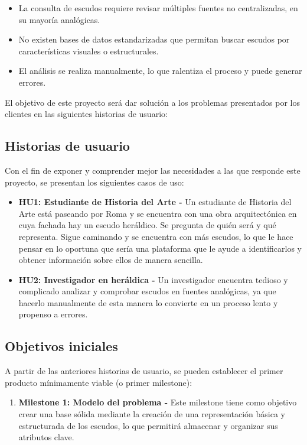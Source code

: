 \begin{itemize}
    \item La consulta de escudos requiere revisar múltiples fuentes no centralizadas, 
    en su mayoría analógicas.
    \item No existen bases de datos estandarizadas que permitan buscar escudos por
    características visuales o estructurales.
    \item El análisis se realiza manualmente, lo que ralentiza el proceso y puede
    generar errores.
\end{itemize}

El objetivo de este proyecto será dar solución a los problemas presentados por los
clientes en las siguientes historias de usuario:

\subsection{Historias de usuario}
Con el fin de exponer y comprender mejor las necesidades a las que responde este
proyecto, se presentan los siguientes casos de uso:

\begin{itemize}
    \item \textbf{HU1: Estudiante de Historia del Arte - }Un estudiante de Historia del 
    Arte está paseando por Roma y se encuentra con una obra arquitectónica en cuya fachada
    hay un escudo heráldico. Se pregunta de quién será y qué representa. Sigue caminando 
    y se encuentra con más escudos, lo que le hace pensar en lo oportuna que sería una 
    plataforma que le ayude a identificarlos y obtener información sobre ellos de manera 
    sencilla.
    \item \textbf{HU2: Investigador en heráldica - }Un investigador encuentra tedioso y
    complicado analizar y comprobar escudos en fuentes analógicas, ya que hacerlo manualmente
    de esta manera lo convierte en un proceso lento y propenso a errores.
\end{itemize}

\subsection{Objetivos iniciales}
A partir de las anteriores historias de usuario, se pueden establecer el primer
producto mínimamente viable (o primer milestone):
\begin{enumerate}
    \item \textbf{Milestone 1: Modelo del problema - }Este milestone tiene como objetivo
    crear una base sólida mediante la creación de una representación básica y estructurada
    de los escudos, lo que permitirá almacenar y organizar sus atributos clave.
\end{enumerate}

